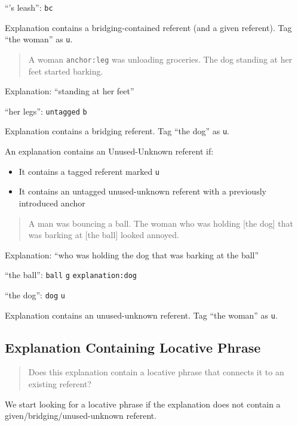 \documentclass[
]{book}
\providecommand{\tightlist}{%
  \setlength{\itemsep}{0pt}\setlength{\parskip}{0pt}}
\begin{document}
``'s leash'': \texttt{bc}

Explanation contains a bridging-contained referent (and a given referent).
Tag ``the woman'' as \texttt{u}.

\begin{quote}
A woman \texttt{anchor:leg} was unloading groceries.
The dog standing at her feet started barking.
\end{quote}

Explanation: ``standing at her feet''

``her legs'': \texttt{untagged} \texttt{b}

Explanation contains a bridging referent.
Tag ``the dog'' as \texttt{u}.

An explanation contains an Unused-Unknown referent if:

\begin{itemize}
\tightlist
\item
  It contains a tagged referent marked \texttt{u}
\item
  It contains an untagged unused-unknown referent with a previously introduced anchor
\end{itemize}

\begin{quote}
A man was bouncing a ball.
The woman who was holding {[}the dog{]} that was barking at {[}the ball{]}
looked annoyed.
\end{quote}

Explanation: ``who was holding the dog that was barking at the ball''

``the ball'': \texttt{ball} \texttt{g} \texttt{explanation:dog}

``the dog'': \texttt{dog} \texttt{u}

Explanation contains an unused-unknown referent.
Tag ``the woman'' as \texttt{u}.

\hypertarget{explanation-containing-locative-phrase}{%
\subsection{Explanation Containing Locative Phrase}\label{explanation-containing-locative-phrase}}

\begin{quote}
Does this explanation contain a locative phrase
that connects it to an existing referent?
\end{quote}

We start looking for a locative phrase if
the explanation does not contain a given/bridging/unused-unknown referent.
\end{document}
